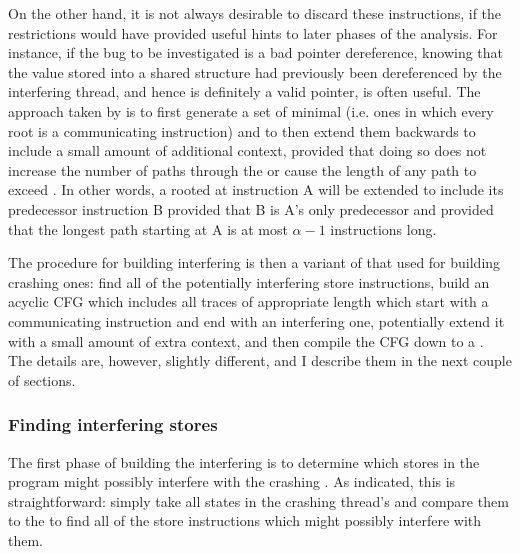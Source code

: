 On the other hand, it is not always desirable to discard these
instructions, if the restrictions would have provided useful hints to
later phases of the analysis.  For instance, if the bug to be
investigated is a bad pointer dereference, knowing that the value
stored into a shared structure had previously been dereferenced by the
interfering thread, and hence is definitely a valid pointer, is often
useful.  The approach taken by {\implementation} is to first generate
a set of minimal  (i.e. ones in which every root is a
communicating instruction) and to then extend them backwards to
include a small amount of additional context, provided that doing so
does not increase the number of paths through the  or
cause the length of any path to exceed \backref{$\alpha$}.  In other
words, a  rooted at instruction A will be extended to
include its predecessor instruction B provided that B is A's only
predecessor and provided that the longest path starting at A is at
most $\alpha - 1$ instructions long.


The procedure for building interfering {\StateMachines} is then a
variant of that used for building crashing ones: find all of the
potentially interfering store instructions, build an acyclic CFG which
includes all traces of appropriate length which start with a
communicating instruction and end with an interfering one, potentially
extend it with a small amount of extra context, and then compile the
CFG down to a {\StateMachine}.  The details are, however, slightly
different, and I describe them in the next couple of sections.

\subsubsection{Finding interfering stores}


The first phase of building the interfering {\StateMachines} is to
determine which stores in the program might possibly interfere with
the crashing {\StateMachine}.  As indicated, this is straightforward:
simply take all  states in the crashing thread's
{\StateMachine} and compare them to the  to
find all of the store instructions which might possibly interfere with
them.

